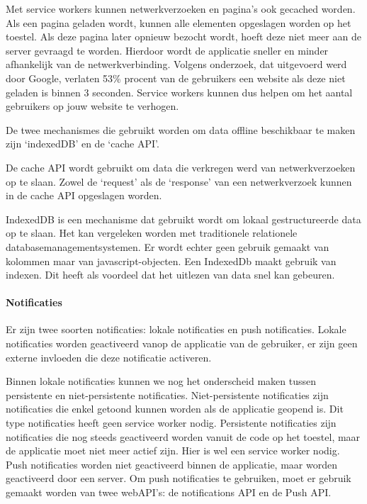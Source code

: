 Met service workers kunnen netwerkverzoeken en pagina’s ook gecached worden. Als een pagina geladen wordt, kunnen alle elementen opgeslagen worden op het toestel. Als deze pagina later opnieuw bezocht wordt, hoeft deze niet meer aan de server gevraagd te worden. Hierdoor wordt de applicatie sneller en minder afhankelijk van de netwerkverbinding.
Volgens onderzoek, dat uitgevoerd werd door Google, verlaten 53\% procent van de gebruikers een website als deze niet geladen is binnen 3 seconden. Service workers kunnen dus helpen om het aantal gebruikers op jouw website te verhogen.

\autocite{Google2017}

De twee mechanismes die gebruikt worden om data offline beschikbaar te maken zijn ‘indexedDB’ en de ‘cache API’.
\autocite{Osmani2019}
\autocite{Mozilla2020a}

De cache API wordt gebruikt om data die verkregen werd van netwerkverzoeken op te slaan. Zowel de ‘request’ als de ‘response’ van een netwerkverzoek kunnen in de cache API opgeslagen worden.
\autocite{Scales2019}


IndexedDB is een mechanisme dat gebruikt wordt om lokaal gestructureerde data op te slaan. Het kan vergeleken worden met traditionele relationele databasemanagementsystemen. Er wordt echter geen gebruik gemaakt van kolommen maar van javascript-objecten. 
Een IndexedDb maakt gebruik van indexen. Dit heeft als voordeel dat het uitlezen van data snel kan gebeuren.
\autocite{Mozilla2019}


\paragraph{Notificaties}

Er zijn twee soorten notificaties: lokale notificaties en push notificaties. 
Lokale notificaties worden geactiveerd vanop de applicatie van de gebruiker, er zijn geen externe invloeden die deze notificatie activeren.

Binnen lokale notificaties kunnen we nog het onderscheid maken tussen persistente en niet-persistente notificaties.
Niet-persistente notificaties zijn notificaties die enkel getoond kunnen worden als de applicatie geopend is. Dit type notificaties heeft geen service worker nodig. 
Persistente notificaties zijn notificaties die nog steeds geactiveerd worden vanuit de code op het toestel, maar de applicatie moet niet meer actief zijn. Hier is wel een service worker nodig.
{\tiny }
Push notificaties worden niet geactiveerd binnen de applicatie, maar worden geactiveerd door een server.
Om push notificaties te gebruiken, moet er gebruik gemaakt worden van twee webAPI’s: de notifications API en de Push API.

